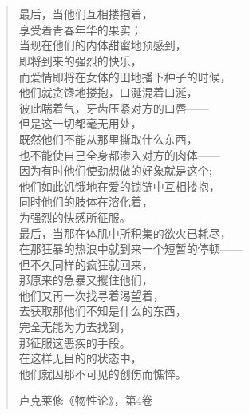 \chapter*{}

\null\vfill
\begin{quote}
    
最后，当他们互相搂抱着，\\
享受着青春年华的果实；\\
当现在他们的内体甜蜜地预感到，\\
即将到来的强烈的快乐，\\
而爱情即将在女体的田地播下种子的时候，\\
他们就贪馋地搂抱，口涎混着口涎，\\
彼此喘着气，牙齿压紧对方的口唇——\\
但是这一切都毫无用处，\\
既然他们不能从那里撕取什么东西，\\
也不能使自己全身都渗入对方的肉体——\\
因为有时他们使劲想做的好象就是这个; \\
他们如此饥饿地在爱的锁链中互相搂抱，\\
同时他们的肢体在溶化着，\\
为强烈的快感所征服。\\
最后，当那在体肌中所积集的欲火已耗尽，\\
在那狂暴的热浪中就到来一个短暂的停顿——\\
但不久同样的疯狂就回来，\\
那原来的急暴又攫住他们，\\
他们又再一次找寻着渴望着，\\
去获取那他们不知是什么的东西，\\
完全无能为力去找到，\\
那征服这恶疾的手段。 \\
在这样无目的的状态中，\\
他们就因那不可见的创伤而憔悴。

\hfill 卢克莱修《物性论》，第4卷\vfill

\end{quote}
